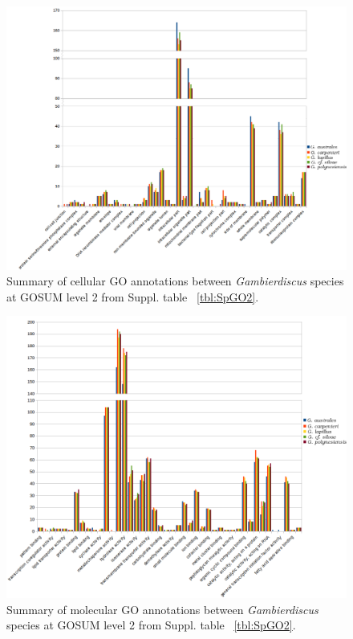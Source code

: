 \documentclass[12pt]{article}
\begin{document}
\begin{figure} 
\includegraphics[scale=.6]{3Aug18_cluster-investigation/figures/gosum-species/Species-gosum2-cell2-split.png} 
\caption{Summary of cellular GO annotations between \textit{Gambierdiscus} species at GOSUM level 2 from Suppl. table ~\ref{tbl:SpGO2}.} 
\label{fig:SpecGo2Cell}
\end{figure} 
\FloatBarrier

\begin{figure} 
\includegraphics[scale=.6]{3Aug18_cluster-investigation/figures/gosum-species/Species-gosum2-molec-split.png} 
\caption{Summary of molecular GO annotations between \textit{Gambierdiscus} species at GOSUM level 2 from Suppl. table ~\ref{tbl:SpGO2}.}  
\label{fig:SpecGo2Molec}
\end{figure} 
\FloatBarrier
\end{document}
